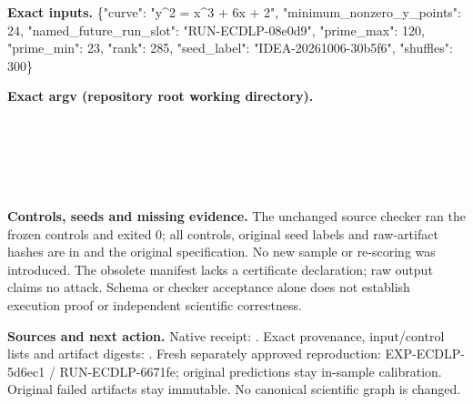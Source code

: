 \documentclass[10pt]{article}
\begin{document}
\textbf{Exact inputs.} \{"curve": "y\textasciicircum{}2 = x\textasciicircum{}3 + 6x + 2", "minimum\_nonzero\_y\_points": 24, "named\_future\_run\_slot": "RUN-ECDLP-08e0d9", "prime\_max": 120, "prime\_min": 23, "rank": 285, "seed\_label": "IDEA-20261006-30b5f6", "shuffles": 300\}

\textbf{Exact argv (repository root working directory).}\\
{\footnotesize {}\\
\\
\\
\\
\\
}

\textbf{Controls, seeds and missing evidence.} The unchanged source checker ran the frozen controls and exited 0; all controls, original seed labels and raw-artifact hashes are in  and the original specification. No new sample or re-scoring was introduced. The obsolete manifest lacks a certificate declaration; raw output claims no attack. Schema or checker acceptance alone does not establish execution proof or independent scientific correctness.

\textbf{Sources and next action.} Native receipt: . Exact provenance, input/control lists and artifact digests: . Fresh separately approved reproduction: EXP-ECDLP-5d6ec1 / RUN-ECDLP-6671fe; original predictions stay in-sample calibration. Original failed artifacts stay immutable. No canonical scientific graph is changed.
\end{document}
